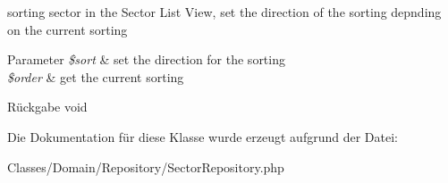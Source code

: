 sorting sector in the Sector List View, set the direction of the sorting depnding on the current sorting


\begin{DoxyParams}{Parameter}
{\em \$sort} & set the direction for the sorting \\
\hline
{\em \$order} & get the current sorting \\
\hline
\end{DoxyParams}
\begin{DoxyReturn}{Rückgabe}
void 
\end{DoxyReturn}


Die Dokumentation für diese Klasse wurde erzeugt aufgrund der Datei\+:\begin{DoxyCompactItemize}
\item 
Classes/\+Domain/\+Repository/Sector\+Repository.\+php\end{DoxyCompactItemize}

